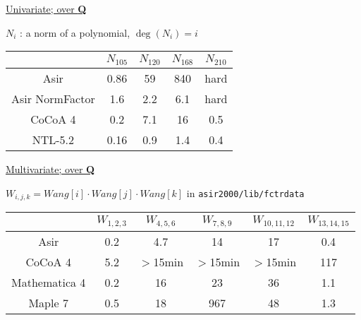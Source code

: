 \documentclass{slides}
\begin{document}
\begin{slide}{}

\underline{Univariate; over {\bf Q}}

$N_i$ : a norm of a polynomial, $\deg(N_i) = i$
\begin{center}
\begin{tabular}{|c||c|c|c|c|} \hline
		& $N_{105}$ & $N_{120}$ & $N_{168}$ & $N_{210}$ \\ \hline
Asir 	& 0.86	& 59 & 840 & hard \\ \hline
Asir NormFactor & 1.6 	& 2.2& 6.1& hard \\ \hline
CoCoA 4 & 0.2 	& 7.1	& 16 & 0.5 \\ \hline\hline
NTL-5.2	& 0.16 	& 0.9 	& 1.4 & 0.4 \\ \hline
\end{tabular}
\end{center}

\underline{Multivariate; over {\bf Q}}

$W_{i,j,k} = Wang[i]\cdot Wang[j]\cdot Wang[k]$ in {\tt asir2000/lib/fctrdata}
\begin{center}
\begin{tabular}{|c||c|c|c|c|c|} \hline
	& $W_{1,2,3}$ & $W_{4,5,6}$ & $W_{7,8,9}$ & $W_{10,11,12}$ & $W_{13,14,15}$ \\ \hline
Asir 	& 0.2 & 4.7 & 14 & 17 & 0.4 \\ \hline
CoCoA 4 & 5.2 & $>$15min 	& $>$15min & $>$15min & 117 \\ \hline\hline
Mathematica 4& 0.2 	& 16 	& 23 & 36 & 1.1 \\ \hline
Maple 7& 0.5 	& 18 	& 967  & 48 & 1.3 \\ \hline
\end{tabular}
\end{center}

\end{slide}
\end{document}
